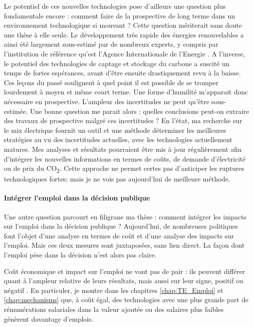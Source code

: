 Le potentiel de ces nouvelles technologies pose d'ailleurs une question plus fondamentale encore : comment faire de la prospective de long terme dans un environnement technologique si mouvant ? Cette question mériterait sans doute une thèse à elle seule. Le développement très rapide des énergies renouvelables a ainsi été largement sous-estimé par de nombreux experts, y compris par l'institution de référence qu'est l'Agence Internationale de l'Energie \citep{Metayer2015, Creutzig2017}. A l'inverse, le potentiel des technologies de captage et stockage du carbone a suscité un temps de fortes espérances, avant d'être ensuite drastiquement revu à la baisse. Ces leçons du passé soulignent à quel point il est possible de se tromper lourdement à moyen et même court terme. Une forme d'humilité m'apparait donc nécessaire en prospective. L'ampleur des incertitudes ne peut qu'être sous-estimée. Une bonne question me parait alors : quelles conclusions peut-on extraire des travaux de prospective malgré ces incertitudes ? 
En l'état, ma recherche sur le mix électrique fournit un outil et une méthode déterminer les meilleures stratégies au vu des incertitudes actuelles, avec les technologies actuellement matures. Mes analyses et résultats pourraient être mis à jour régulièrement afin d’intégrer les nouvelles informations en termes de coûts, de demande d’électricité ou de prix du CO\textsubscript{2}. Cette approche ne permet certes pas d'anticiper les ruptures technologiques fortes; mais je ne vois pas aujourd'hui de meilleure méthode.

\paragraph{Intégrer l'emploi dans la décision publique} \hfill

Une autre question parcourt en filigrane ma thèse : comment intégrer les impacts sur l'emploi dans la décision publique ?
Aujourd'hui, de nombreuses politiques font l'objet d'une analyse en termes de coût et d'une analyse des impacts sur l'emploi. Mais ces deux mesures sont juxtaposées, sans lien direct. La façon dont l'emploi pèse dans la décision n'est alors pas claire.

Coût économique et impact sur l'emploi ne vont pas de pair : ils peuvent différer quant à l'ampleur relative de leurs résultats, mais aussi sur leur signe, positif ou négatif \citep{Patuelli2005}. 
En particuler, je montre dans les chapitres \ref{chap:TE_Emploi} et \ref{chap:mechanisms} que, à coût égal, des technologies avec une plus grande part de rémunérations salariales dans la valeur ajoutée ou des salaires plus faibles génèrent davantage d'emplois. 

